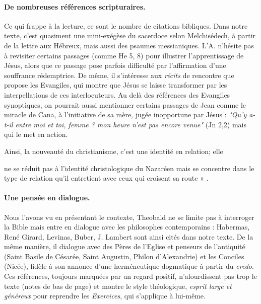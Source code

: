 \paragraph{De nombreuses références scripturaires.} Ce qui frappe à la lecture, ce sont le nombre de citations bibliques. Dans notre texte, c'est quasiment une mini-exégèse du sacerdoce selon Melchisédech, à partir de la lettre aux Hébreux, mais aussi des psaumes messianiques. L'A. n'hésite pas à revisiter certains passages (comme He 5, 8) pour illustrer l'apprentissage de Jésus, alors que ce passage pose parfois difficulté par l'affirmation d'une souffrance rédemptrice.
De même, il s'intéresse aux \textit{récits}  de rencontre que propose les Evangiles, qui montre que Jésus se laisse transformer par les interpellations de ces interlocuteurs. Au delà des références des Evangiles synoptiques, on pourrait aussi mentionner certains passages de Jean comme le miracle de Cana, à l'initiative de sa mère, jugée inopportune par Jésus : \textit{"Qu’y a-t-il entre moi et toi, femme  ? mon heure n'est pas encore venue"} (Jn 2,2) mais qui le met en action. 

Ainsi, la nouveauté du christianisme, c'est une identité en relation; elle
\begin{singlequote}
     [\ldots] ne se réduit pas à l’identité christologique du Nazaréen mais se concentre dans le type de relation qu’il entretient avec ceux qui croisent sa route » \cite[p. 57]{theobald_christianisme_2007}.
\end{singlequote}

\paragraph{Une pensée en dialogue.} Nous l'avons vu en présentant le contexte, Theobald ne se limite pas à interroger la Bible mais entre en dialogue avec les philosophes contemporains : Habermas, René Girard, Levinas, Buber, J. Lambert sont ainsi cités dans notre texte. De la même manière, il dialogue avec des Pères de l'Eglise et penseurs de l'antiquité (Saint Basile de Césarée, Saint Augustin, Philon d'Alexandrie) et les Conciles (Nicée), fidèle à son annonce d'une herméneutique dogmatique à partir du \textit{credo}. Ces références, toujours marquées par un regard positif, n'alourdissent pas trop le texte (notes de bas de page) et montre le style théologique, \textit{esprit large et généreux} pour reprendre les \textit{Exercices}, qui s'applique à lui-même.



